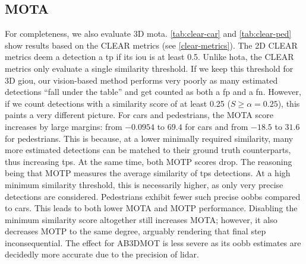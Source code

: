\documentclass[headsepline, hidelinks, footsepline, footinclude=false, oneside, fontsize=11pt, paper=a4, listof=totoc, bibliography=totoc]{scrbook}
\begin{document}
\subsection{MOTA}
\label{sec:org4d21e64}
    For completeness, we also evaluate 3D \gls{mota}. 
\cref{tab:clear-car} and \cref{tab:clear-ped} show results based on the CLEAR \cite{bernardinEvaluatingMultipleObject2008} metrics (see \cref{clear-metrics}). 
The 2D CLEAR metrics deem a detection a \gls{tp} if its \gls{iou} is at least 0.5. Unlike \gls{hota}, the CLEAR metrics only evaluate a single similarity threshold.
If we keep this threshold for 3D \gls{giou}, our vision-based method performs very poorly as many estimated detections ``fall under the table'' and get counted as both a \gls{fp} and a \gls{fn}.
However, if we count detections with a similarity score of at least 0.25 (\(S \geq \alpha = 0.25\)), this paints a very different picture. 
For cars and pedestrians, the MOTA score increases by large margins: from \(-0.0954\) to \(69.4\) for cars and from \(-18.5\) to \(31.6\) for pedestrians.
This is because, at a lower minimally required similarity, many more estimated detections can be matched to their ground truth counterparts, thus increasing \glspl{tp}.
At the same time, both MOTP scores drop. The reasoning being that MOTP measures the average similarity of \glspl{tp} detections. At a high minimum similarity threshold, this is necessarily higher, as only 
very precise detections are considered. 
Pedestrians exhibit fewer such precise \glspl{oobb} compared to cars. This leads to both lower MOTA and MOTP performance.
Disabling the minimum similarity score altogether still increases MOTA; however, it also decreases MOTP to the same degree, arguably rendering that final step inconsequential.
The effect for AB3DMOT is less severe as its \gls{oobb} estimates are decidedly more accurate due to the precision of \gls{lidar}.
\end{document}
